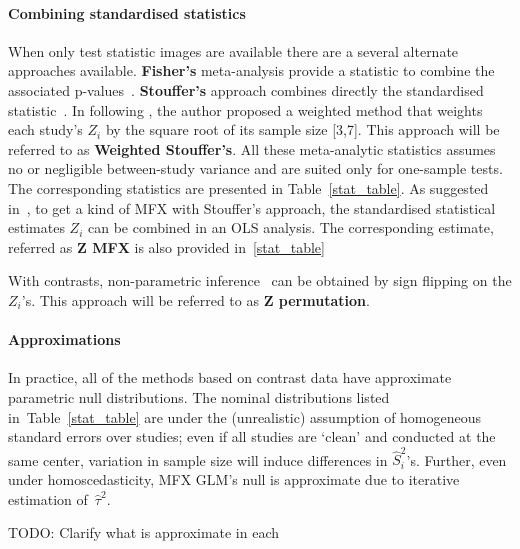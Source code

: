 \documentclass{llncs}
\newcommand{\vareffect}[1][i]{\hat S^2_{#1}}
\newcommand{\zeffect}[1][i]{Z_{#1}}
\newcommand{\estvarBetween}{\hat\tau^2}
\begin{document}
\paragraph{Combining standardised statistics} 
When only test statistic images are available there are a several alternate approaches available. \textbf{Fisher's} meta-analysis provide a statistic to combine the associated p-values~\cite{Fisher1932}. \textbf{Stouffer's} approach combines directly the standardised statistic~\cite{Stouffer1949}. In \cite{Zaykin2011} following \cite{Liptak1958}, the author proposed a weighted method that weights each study's $\zeffect$ by the square root of its sample size [3,7]. This approach will be referred to as \textbf{Weighted Stouffer's}. All these meta-analytic statistics assumes no or negligible between-study variance and are suited only for one-sample tests. The corresponding statistics are presented in Table~\ref{stat_table}.
As suggested in~\cite{Salimi-khorshidi2009}, to get a kind of MFX with Stouffer's approach, the standardised statistical estimates $\zeffect$ can be combined in an OLS analysis. The corresponding estimate, referred as \textbf{Z MFX} is also provided in~\ref{stat_table}

With contrasts, non-parametric inference~\cite{Holmes1996,Nichols2002} can be obtained by sign flipping on the $\zeffect$'s. This approach will be referred to as \textbf{Z permutation}.

\paragraph{Approximations}  In practice, all of the methods based on contrast data have approximate parametric null distributions.  The nominal distributions listed in~Table~\ref{stat_table} are under the (unrealistic) assumption of homogeneous standard errors over studies; even if all studies are `clean' and conducted at the same center, variation in sample size will induce differences in $\vareffect$'s.  Further, even under homoscedasticity, MFX GLM's null is approximate due to iterative estimation of~$\estvarBetween$.

TODO: Clarify what is approximate in each

\end{document}
